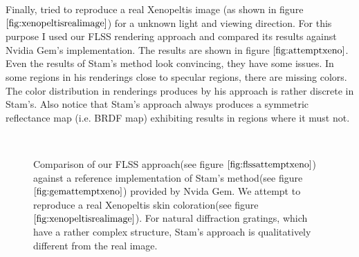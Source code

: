 Finally, tried to reproduce a real Xenopeltis image (as shown in figure $\ref{fig:xenopeltisrealimage}$) for a unknown light and viewing direction. For this purpose I used our FLSS rendering approach and compared its results against Nvidia Gem's implementation. The results are shown in figure $\ref{fig:attemptxeno}$. Even the results of Stam's method look convincing, they have some issues. In some regions in his renderings close to specular regions, there are missing colors. The color distribution in renderings produces by his approach is rather discrete in Stam's. Also notice that Stam's approach always produces a symmetric reflectance map (i.e. BRDF map) exhibiting results in regions where it must not. 

\begin{figure}[H]
  \centering

~  
  
\caption[Snake Renderings: Stam's vs. FLSS Approach on Xenopeltis]{Comparison of our FLSS approach(see figure $\ref{fig:flssattemptxeno}$) against a reference implementation of Stam's method(see figure $\ref{fig:gemattemptxeno}$) provided by Nvida Gem. We attempt to reproduce a real Xenopeltis skin coloration(see figure $\ref{fig:xenopeltisrealimage}$). For natural diffraction gratings, which have a rather complex structure, Stam's approach is qualitatively different from the real image.}
\label{fig:attemptxeno}
\end{figure}